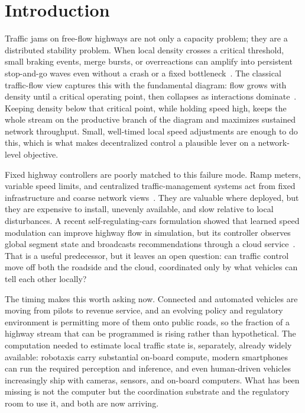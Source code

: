 \section{Introduction}
\label{sec:intro}

Traffic jams on free-flow highways are not only a capacity problem; they are a distributed stability problem. When local density crosses a critical threshold, small braking events, merge bursts, or overreactions can amplify into persistent stop-and-go waves even without a crash or a fixed bottleneck~\cite{bhardwaj2023understanding,sugiyama2008traffic}. The classical traffic-flow view captures this with the fundamental diagram: flow grows with density until a critical operating point, then collapses as interactions dominate~\cite{greenshields1935study,lighthill1955kinematic,richards1956shock}. Keeping density below that critical point, while holding speed high, keeps the whole stream on the productive branch of the diagram and maximizes sustained network throughput. Small, well-timed local speed adjustments are enough to do this, which is what makes decentralized control a plausible lever on a network-level objective.

Fixed highway controllers are poorly matched to this failure mode. Ramp meters, variable speed limits, and centralized traffic-management systems act from fixed infrastructure and coarse network views~\cite{arnold1998ramp,papageorgiou2002freeway}. They are valuable where deployed, but they are expensive to install, unevenly available, and slow relative to local disturbances. A recent self-regulating-cars formulation showed that learned speed modulation can improve highway flow in simulation, but its controller observes global segment state and broadcasts recommendations through a cloud service~\cite{self_regulating_cars}. That is a useful predecessor, but it leaves an open question: can traffic control move off both the roadside and the cloud, coordinated only by what vehicles can tell each other locally?

The timing makes this worth asking now. Connected and automated vehicles are moving from pilots to revenue service, and an evolving policy and regulatory environment is permitting more of them onto public roads, so the fraction of a highway stream that can be programmed is rising rather than hypothetical. The computation needed to estimate local traffic state is, separately, already widely available: robotaxis carry substantial on-board compute, modern smartphones can run the required perception and inference, and even human-driven vehicles increasingly ship with cameras, sensors, and on-board computers. What has been missing is not the computer but the coordination substrate and the regulatory room to use it, and both are now arriving.

